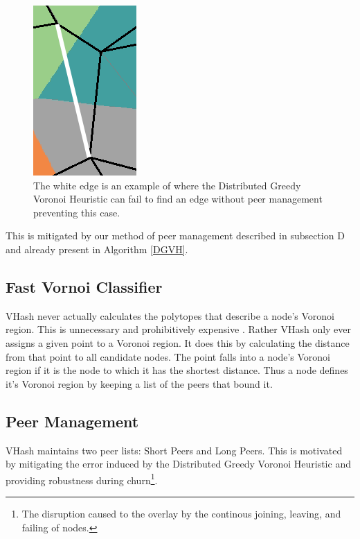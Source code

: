 \documentclass{IEEEtran}
\begin{document}
\begin{figure}
	\centering
	\includegraphics[width=0.3\linewidth]{blocking-example2}
	\caption{The white edge is an example of where the Distributed Greedy Voronoi Heuristic can fail to find an edge without peer management preventing this case.}
	\label{occ-ex}
\end{figure}


This is mitigated by our method of peer management described in subsection D and already present in Algorithm \ref{DGVH}.


\subsection{Fast Vornoi Classifier}
VHash never actually calculates the polytopes that describe a node's Voronoi region.
This is unnecessary and prohibitively expensive \cite{raynet}.
Rather VHash only ever assigns a given point to a Voronoi region.
It does this by calculating the distance from that point to all candidate nodes.
The point falls into a node's Voronoi region if it is the node to which it has the shortest distance.
Thus a node defines it's Voronoi region by keeping a list of the peers that bound it.

\subsection{Peer Management}
VHash maintains two peer lists: Short Peers and Long Peers.
This is motivated by mitigating the error induced by the Distributed Greedy Voronoi Heuristic and providing robustness during churn\footnote{The disruption caused to the overlay by the continous joining, leaving, and failing of nodes.}.
\end{document}
